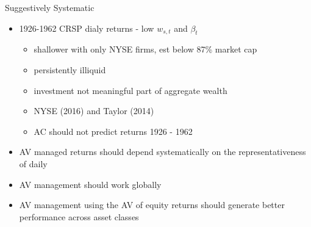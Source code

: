 \documentclass{beamer}
\begin{document}
\begin{frame}{Suggestively Systematic}
	\begin{itemize}[<+->]
		\item 1926-1962 CRSP dialy returns - low $w_{s,t}$ and $\beta_{t}$
		\begin{itemize}[<+->]
			\item shallower with only NYSE firms, est below 87\% market cap
			\item persistently illiquid
			\item investment not meaningful part of aggregate wealth
			\item NYSE (2016) and Taylor (2014)
			\item AC should not predict returns 1926 - 1962
		\end{itemize}
		\item AV managed returns should depend systematically on the representativeness of daily 
		\item AV management should work globally
		\item AV management using the AV of equity returns should generate better performance across asset classes
	\end{itemize}
\end{frame}
\end{document}
